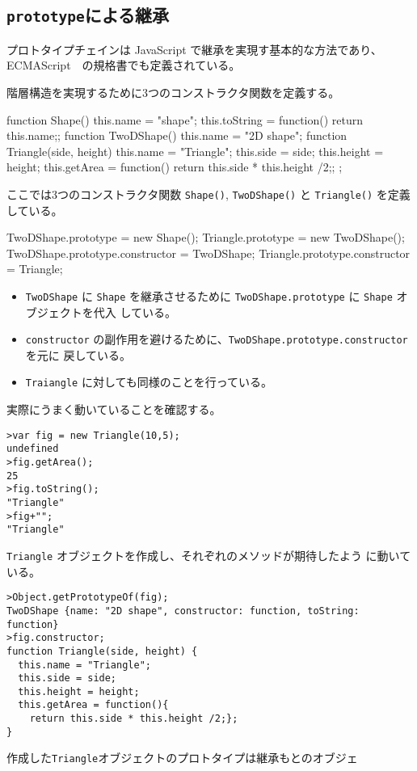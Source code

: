 \subsection{\protect\texttt{prototype}による継承}
プロトタイプチェインは JavaScript で継承を実現す基本的な方法であり、
ECMAScript　の規格書でも定義されている。
\begin{Exec}\label{Proto6-1}\upshape
階層構造を実現するために3つのコンストラクタ関数を定義する。
\begin{listing}{1}
 function Shape() {
  this.name = "shape";
  this.toString = function() {return this.name;};
}
function TwoDShape(){
  this.name = "2D shape";
}
function Triangle(side, height) {
  this.name = "Triangle";
  this.side = side;
  this.height = height;
  this.getArea = function(){
    return this.side * this.height /2;};
};
\end{listing}
ここでは3つのコンストラクタ関数 \texttt{Shape()}, \texttt{TwoDShape()}
 と \texttt{Triangle()} を定義している。
\begin{listingcont}
TwoDShape.prototype = new Shape();
Triangle.prototype = new TwoDShape();
TwoDShape.prototype.constructor = TwoDShape;
Triangle.prototype.constructor = Triangle;
\end{listingcont}
\begin{itemize}
 \item \texttt{TwoDShape} に \texttt{Shape} を継承させるために
       \texttt{TwoDShape.prototype} に \texttt{Shape} オブジェクトを代入
       している。
 \item \texttt{constructor}
 の副作用を避けるために、\texttt{TwoDShape.prototype.constructor} を元に
 戻している。
 \item \texttt{Traiangle} に対しても同様のことを行っている。
\end{itemize}
実際にうまく動いていることを確認する。
\begin{verbatim}
>var fig = new Triangle(10,5);
undefined
>fig.getArea();
25
>fig.toString();
"Triangle"
>fig+"";
"Triangle"
\end{verbatim}
\texttt{Triangle} オブジェクトを作成し、それぞれのメソッドが期待したよう
 に動いている。
\begin{verbatim}
>Object.getPrototypeOf(fig);
TwoDShape {name: "2D shape", constructor: function, toString: function}
>fig.constructor;
function Triangle(side, height) {
  this.name = "Triangle";
  this.side = side;
  this.height = height;
  this.getArea = function(){
    return this.side * this.height /2;};
} 
\end{verbatim}
作成した\texttt{Triangle}オブジェクトのプロトタイプは継承もとのオブジェ

\end{Exec}
